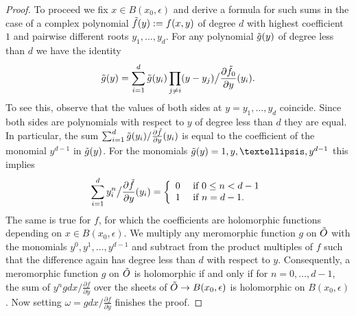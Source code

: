 \documentclass[11pt,twoside]{amsart}
\theoremstyle{plain}
\begin{document}
\begin{proof}
To proceed we fix $x\in B(x_0,\epsilon)$ and derive a formula for such sums in the case of a complex polynomial $\Tilde{f}(y):=f(x,y)$ of degree $d$ with highest coefficient $1$ and pairwise different roots $y_1,\ldots, y_d$. For any polynomial $\Tilde{g}(y)$ of degree less than $d$ we have the identity
\begin{equation}\label{eq:pol 1}
\Tilde{g}(y)=\sum_{i=1}^d\Tilde{g}(y_i)\prod_{j\ne i}(y-y_j)\big/\frac{\partial\Tilde{f}_0}{\partial y}(y_i).
\end{equation}
To see this, observe that the values of both sides at $y=y_1,\ldots, y_d$ coincide. Since both sides are polynomials with respect to $y$ of degree less than $d$ they are equal. In particular, the sum $\sum_{i=1}^d\Tilde{g}(y_i)/\frac{\partial\Tilde{f}}{\partial y}(y_i)$ is equal to the coefficient of the monomial $y^{d-1}$ in $\Tilde{g}(y)$. For the monomials $\Tilde{g}(y)=1,y,\ldots,y^{d-1}$ this implies
\begin{equation}\label{eq:pol 2}
\sum_{i=1}^dy_i^n\big/\frac{\partial\Tilde{f}}{\partial y}(y_i)=\left\{
\begin{array}{ll}
0&\mbox{ if }0\le n<d-1\\
1&\mbox{ if }n=d-1.\end{array}\right.
\end{equation}
The same is true for $f$, for which the coefficients are holomorphic functions depending on $x\in B(x_0,\epsilon)$. %
We multiply any meromorphic function $g$ on $\Tilde{O}$ with the monomials $y^0,y^1,\ldots, y^{d-1}$ and subtract  from the product multiples of $f$ such that the difference again has degree less than $d$ with respect to $y$. Consequently, a meromorphic function $g$ on $\Tilde{O}$ is holomorphic if and only if for $n=0,\ldots, d-1$, the sum of $y^n gdx/\frac{\partial f}{\partial y}$ over the sheets of $\Tilde{O}\to B(x_0,\epsilon)$ is holomorphic on $B(x_0,\epsilon)$. Now setting $\omega= gdx/\frac{\partial f}{\partial y}$ finishes the proof.
\end{proof}
%
\end{document}
